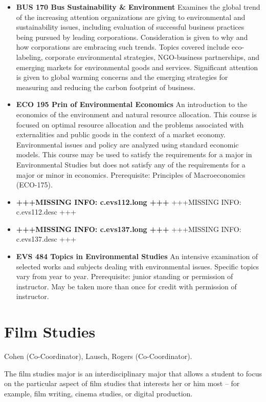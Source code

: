 \documentclass[
  letterpaper,
]{scrbook}
\providecommand{\tightlist}{%
  \setlength{\itemsep}{0pt}\setlength{\parskip}{0pt}}
\begin{document}
\begin{itemize}
\tightlist
\item
  \textbf{BUS 170 Bus Sustainability \& Environment} Examines the global
  trend of the increasing attention organizations are giving to
  environmental and sustainability issues, including evaluation of
  successful business practices being pursued by leading corporations.
  Consideration is given to why and how corporations are embracing such
  trends. Topics covered include eco-labeling, corporate environmental
  strategies, NGO-business partnerships, and emerging markets for
  environmental goods and services. Significant attention is given to
  global warming concerns and the emerging strategies for measuring and
  reducing the carbon footprint of business.
\item
  \textbf{ECO 195 Prin of Environmental Economics} An introduction to
  the economics of the environment and natural resource allocation. This
  course is focused on optimal resource allocation and the problems
  associated with externalities and public goods in the context of a
  market economy. Environmental issues and policy are analyzed using
  standard economic models. This course may be used to satisfy the
  requirements for a major in Environmental Studies but does not satisfy
  any of the requirements for a major or minor in economics.
  Prerequisite: Principles of Macroeconomics (ECO-175).
\item
  \textbf{+++MISSING INFO: c.evs112.long +++} +++MISSING INFO:
  c.evs112.desc +++
\item
  \textbf{+++MISSING INFO: c.evs137.long +++} +++MISSING INFO:
  c.evs137.desc +++
\item
  \textbf{EVS 484 Topics in Environmental Studies} An intensive
  examination of selected works and subjects dealing with environmental
  issues. Specific topics vary from year to year. Prerequisite: junior
  standing or permission of instructor. May be taken more than once for
  credit with permission of instructor.
\end{itemize}

\section{Film Studies}\label{sec-film-studies}

Cohen (Co-Coordinator), Lausch, Rogers (Co-Coordinator).

The film studies major is an interdisciplinary major that allows a
student to focus on the particular aspect of film studies that interests
her or him most -- for example, film writing, cinema studies, or digital
production.
\end{document}

